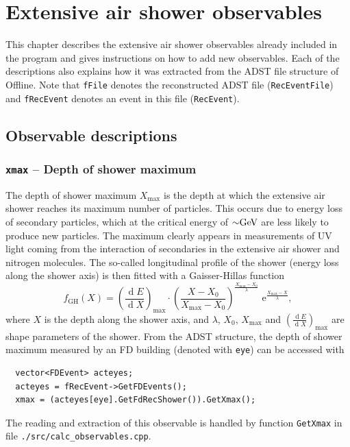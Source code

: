 \documentclass[12pt,a4paper]{report}
\newcommand{\diff}{\operatorname{d}\!}	%
\newcommand{\me}{\, \mathrm{e}}	%
\begin{document}
\chapter{Extensive air shower observables} \label{ch:observables}
{\noindent}This chapter describes the extensive air shower observables already included in the program and gives instructions on how to add new observables. Each of the descriptions also explains how it was extracted from the ADST file structure of Offline. Note that \texttt{fFile} denotes the reconstructed ADST file (\texttt{RecEventFile}) and \texttt{fRecEvent} denotes an event in this file (\texttt{RecEvent}).

\section{Observable descriptions}

\subsection{\texttt{xmax} -- Depth of shower maximum}
The depth of shower maximum $X_{\textrm{max}}$ is the depth at which the extensive air shower reaches its maximum number of particles. This occurs due to energy loss of secondary particles, which at the critical energy of ${\sim}\unit[]{GeV}$ are less likely to produce new particles. The maximum clearly appears in measurements of UV light coming from the interaction of secondaries in the extensive air shower and nitrogen molecules. The so-called longitudinal profile of the shower (energy loss along the shower axis) is then fitted with a Gaisser-Hillas function
\begin{equation}\label{eq:gaisserHillas}
f_{\textrm{GH}}(X) = \left(\frac{\diff E}{\diff X}\right)_{\textrm{max}}\cdot \left(\frac{X - X_0}{X_{\textrm{max}} - X_0}\right)^{\frac{X_{\textrm{max}} - X_0}{\lambda}}\, \me^{\frac{X_{\textrm{max}} - X}{\lambda}},
\end{equation}
where $X$ is the depth along the shower axis, and $\lambda$, $X_0$, $X_{\textrm{max}}$ and $\left(\frac{\diff E}{\diff X}\right)_{\textrm{max}}$ are shape parameters of the shower. From the ADST structure, the depth of shower maximum measured by an FD building (denoted with \texttt{eye}) can be accessed with
\begin{verbatim}
  vector<FDEvent> acteyes;
  acteyes = fRecEvent->GetFDEvents();
  xmax = (acteyes[eye].GetFdRecShower()).GetXmax();
\end{verbatim}
The reading and extraction of this observable is handled by function \texttt{GetXmax} in file \texttt{./src/calc\_observables.cpp}.
\end{document}
